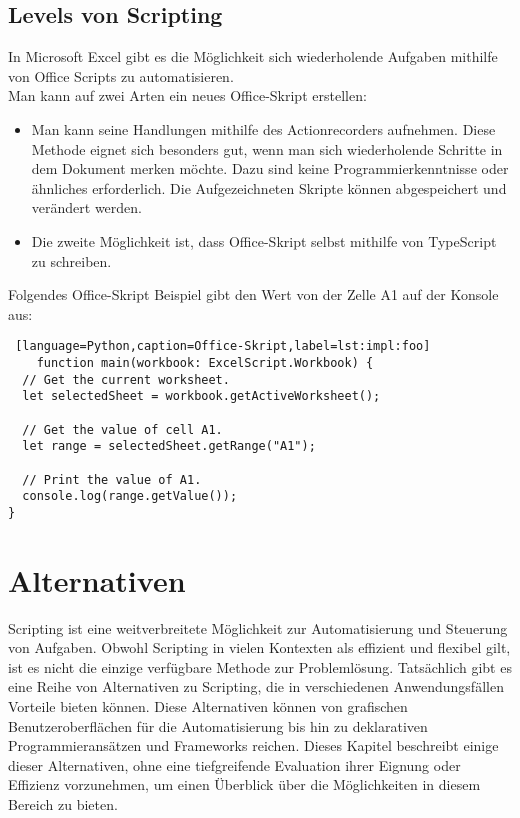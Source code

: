 \newpage

\subsection*{Levels von Scripting}

In Microsoft Excel gibt es die Möglichkeit sich wiederholende Aufgaben mithilfe 
von Office Scripts zu automatisieren.
\\
Man kann auf zwei Arten ein neues Office-Skript erstellen:
\begin{itemize}
    \item Man kann seine Handlungen mithilfe des Actionrecorders aufnehmen. 
    Diese Methode eignet sich besonders gut, wenn man sich wiederholende 
    Schritte in dem Dokument merken möchte. Dazu sind keine Programmierkenntnisse 
    oder ähnliches erforderlich. Die Aufgezeichneten Skripte können 
    abgespeichert und verändert werden.
    \item Die zweite Möglichkeit ist, dass Office-Skript selbst mithilfe 
    von TypeScript zu schreiben.
\end{itemize}
\cite{office_script}

Folgendes Office-Skript Beispiel gibt den Wert von der Zelle A1 auf der Konsole aus:

\begin{lstlisting} [language=Python,caption=Office-Skript,label=lst:impl:foo]
    function main(workbook: ExcelScript.Workbook) {
  // Get the current worksheet.
  let selectedSheet = workbook.getActiveWorksheet();

  // Get the value of cell A1.
  let range = selectedSheet.getRange("A1");
  
  // Print the value of A1.
  console.log(range.getValue());
}
\end{lstlisting}
\cite{office_script_example}

\newpage

\section{Alternativen}

Scripting ist eine weitverbreitete Möglichkeit zur Automatisierung und Steuerung von Aufgaben. 
Obwohl Scripting in vielen Kontexten als effizient und flexibel gilt, ist es nicht die 
einzige verfügbare Methode zur Problemlösung. Tatsächlich gibt es eine Reihe von 
Alternativen zu Scripting, die in verschiedenen Anwendungsfällen Vorteile bieten können. 
Diese Alternativen können von grafischen Benutzeroberflächen für die Automatisierung bis 
hin zu deklarativen Programmieransätzen und Frameworks reichen. Dieses Kapitel beschreibt 
einige dieser Alternativen, ohne eine tiefgreifende Evaluation ihrer Eignung oder Effizienz 
vorzunehmen, um einen Überblick über die Möglichkeiten in diesem Bereich zu bieten.

